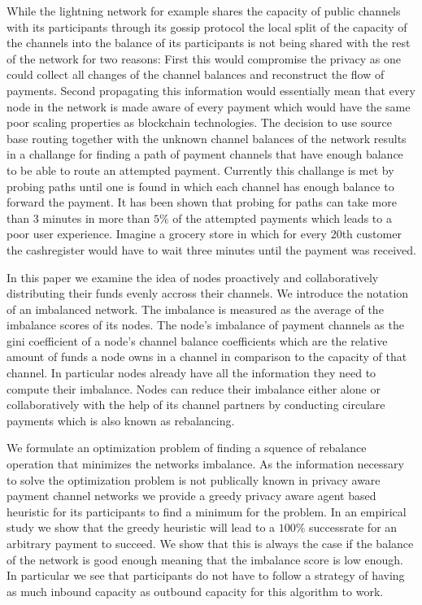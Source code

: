\documentclass[a4paper]{paper}
\begin{document}
While the lightning network for example shares the capacity of public channels with its participants through its gossip protocol the local split of the capacity of the channels into the balance of its participants is not being shared with the rest of the network for two reasons:
First this would compromise the privacy as one could collect all changes of the channel balances and reconstruct the flow of payments.
Second propagating this information would essentially mean that every node in the network is made aware of every payment which would have the same poor scaling properties as blockchain technologies.
The decision to use source base routing together with the unknown channel balances of the network results in a challange for finding a path of payment channels that have enough balance to be able to route an attempted payment.
Currently this challange is met by probing paths until one is found in which each channel has enough balance to forward the payment.
It has been shown that probing for paths can take more than 3 minutes in more than $5\%$ of the attempted payments \cite{decker2019lnconf} which leads to a poor user experience.
Imagine a grocery store in which for every 20th customer the cashregister would have to wait three minutes until the payment was received.

In this paper we examine the idea of nodes proactively and collaboratively distributing their funds evenly accross their channels.
We introduce the notation of an imbalanced network.
The imbalance is measured as the average of the imbalance scores of its nodes.
The node's imbalance of payment channels as the gini coefficient of a node's channel balance coefficients which are the relative amount of funds a node owns in a channel in comparison to the capacity of that channel.
In particular nodes already have all the information they need to compute their imbalance. 
Nodes can reduce their imbalance either alone or collaboratively with the help of its channel partners by conducting circulare payments which is also known as rebalancing.

We formulate an optimization problem of finding a squence of rebalance operation that minimizes the networks imbalance.
As the information necessary to solve the optimization problem is not publically known in privacy aware payment channel networks we provide a greedy privacy aware agent based heuristic for its participants to find a minimum for the problem. 
In an empirical study we show that the greedy heuristic will lead to a $100\%$ successrate for an arbitrary payment to succeed.
We show that this is always the case if the balance of the network is good enough meaning that the imbalance score is low enough.
In particular we see that participants do not have to follow a strategy of having as much inbound capacity as outbound capacity for this algorithm to work. 
\end{document}
